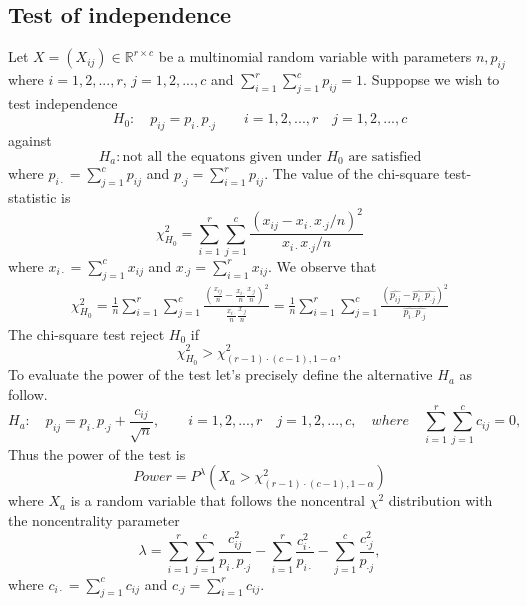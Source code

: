 \documentclass{article}
\begin{document}
\subsection{Test of independence}
Let $X=(X_{ij}) \in \mathbb{R}^{r \times c}$ be a multinomial random variable with
parameters $n,p_{ij}$ where $i=1,2,...,r$, $j=1,2,...,c$ and 
$\sum_{i=1}^r\sum_{j=1}^cp_{ij}=1$. 
Suppopse we wish to test independence
\begin{equation}
    H_0: \quad p_{ij}=p_{i \cdot}p_{\cdot j} \qquad i =1,2,...,r \quad j=1,2,...,c
\end{equation}
against
\begin{equation}
    H_a: \mbox{not all the equatons given under $H_0$ are satisfied}
\end{equation}
where $p_{i \cdot} = \sum_{j=1}^c p_{ij}$ and $p_{\cdot j} = \sum_{i=1}^r p_{ij}$.
The value of the chi-square test-statistic is
\begin{equation}
    \chi^2_{H_0} = \sum_{i=1}^r\sum_{j=1}^c \frac{\left(x_{ij} - x_{i \cdot}x_{\cdot j}/n\right)^2}{x_{i \cdot}x_{\cdot j}/n}
\end{equation}
where $x_{i \cdot} = \sum_{j=1}^c x_{ij}$ and $x_{\cdot j} = \sum_{i=1}^r x_{ij}$.
We observe that
\begin{align}
    \chi^2_{H_0} =\frac{1}{n} \sum_{i=1}^r\sum_{j=1}^c \frac{\left(\frac{x_{ij}}{n} - \frac{x_{i \cdot}}{n}\frac{x_{\cdot j}}{n}\right)^2}{\frac{x_{i \cdot}}{n}\frac{x_{\cdot j}}{n}}=  \frac{1}{n} \sum_{i=1}^r\sum_{j=1}^c \frac{\left(\widehat{p_{ij}} - \widehat{p_{i \cdot}}\widehat{p_{\cdot j}}\right)^2}{\widehat{p_{i \cdot}}\widehat{p_{\cdot j}}}
\end{align}
The chi-square test reject $H_0$ if
\begin{equation}
    \chi^2_{H_0} > \chi^2_{(r-1)\cdot(c-1),1-\alpha},
\end{equation}
To evaluate the power of the test let's precisely define the alternative $H_a$ as follow.
\begin{equation}
    H_a: \quad p_{ij} = p_{i\cdot}p_{\cdot j} + \frac{c_{ij}}{\sqrt{n}}, \qquad i =1,2,...,r \quad j=1,2,...,c, \quad where \quad \sum_{i=1}^{r}\sum_{j=1}^{c}c_{ij}=0, 
\end{equation}
Thus the power of the test is
\begin{equation}
    Power = P^{\lambda}\left(X_a > \chi^2_{(r-1)\cdot(c-1),1-\alpha}\right)
\end{equation}
where $X_a$ is a random variable that follows the noncentral $\chi^2$ distribution with the noncentrality parameter
\begin{equation}
    \lambda = \sum_{i=1}^{r}\sum_{j=1}^c \frac{c_{ij}^2}{p_{i\cdot}p_{\cdot j}} - \sum_{i=1}^{r}\frac{c_{i \cdot}^2}{p_{i \cdot}} - \sum_{j=1}^{c}\frac{c_{\cdot j}^2}{p_{\cdot j}},
\end{equation}
where $c_{i \cdot} = \sum_{j=1}^c c_{ij}$ and $c_{\cdot j} = \sum_{i=1}^r c_{ij}$.
\end{document}

